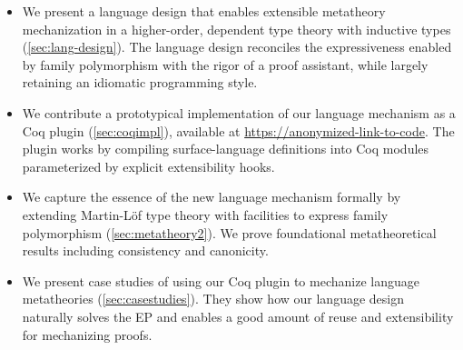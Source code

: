 \begin{itemize}%
    [labelsep=*,leftmargin=1pc,itemsep=3pt]

\item We present a
language design that enables extensible
metatheory mechanization in a higher-order, dependent type theory with
inductive types (\cref{sec:lang-design}).
The language design reconciles the expressiveness enabled by
family polymorphism with the rigor of a proof assistant,
while largely retaining an idiomatic programming style.

\item We contribute a prototypical implementation of our language
mechanism as a Coq plugin (\cref{sec:coqimpl}),
available at \url{https://anonymized-link-to-code}.
The plugin works by
compiling surface-language definitions into Coq modules parameterized by
explicit extensibility hooks.

\item We capture the essence of the new language mechanism formally by extending
Martin-Löf type theory with facilities to express family polymorphism (\cref{sec:metatheory2}).
We prove foundational meta\-theoretical results including consistency
and canonicity.

\item We present case studies of using our Coq plugin to mechanize
language metatheories (\cref{sec:casestudies}).
They show how our language design naturally solves the EP and
enables a good amount of reuse and extensibility
for mechanizing proofs.

\end{itemize}



